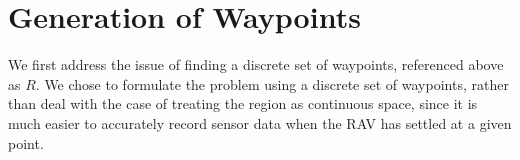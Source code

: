 
\section{Generation of Waypoints}
We first address the issue of finding a discrete set of waypoints, referenced above as $R$. We chose to formulate the problem using a discrete set of waypoints, rather than deal with the case of treating the region as continuous space, since it is much easier to accurately record sensor data when the RAV has settled at a given point.


